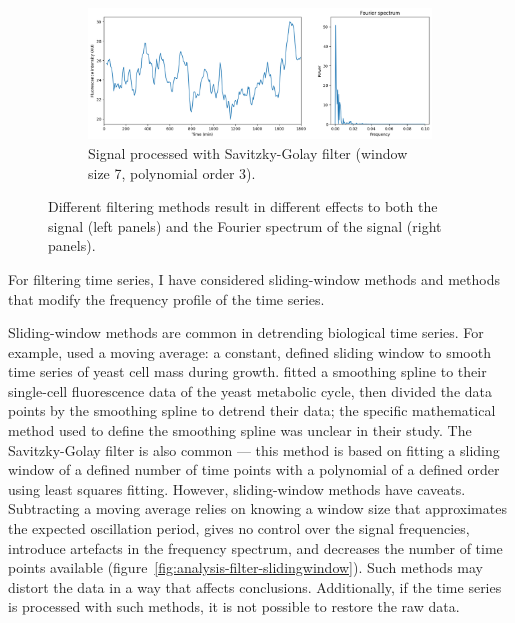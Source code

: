 \begin{figure}
  \begin{subfigure}[htpb]{0.8\textwidth}
   \centering
   \includegraphics[width=\textwidth]{fft_savgol}
   \caption{
     Signal processed with Savitzky-Golay filter (window size 7, polynomial order 3).
   }
   \label{fig:analysis-filter-savgol}
  \end{subfigure}
  \caption{
    Different filtering methods result in different effects to both the signal (left panels) and the Fourier spectrum of the signal (right panels).
  }
  \label{fig:analysis-filter}
\end{figure}

For filtering time series, I have considered sliding-window methods and methods that modify the frequency profile of the time series.

Sliding-window methods are common in detrending biological time series.
For example, \textcite{cunyHighresolutionMassMeasurements2022} used a moving average: a constant, defined sliding window to smooth time series of yeast cell mass during growth.
\textcite{papagiannakisAutonomousMetabolicOscillations2017} fitted a smoothing spline to their single-cell fluorescence data of the yeast metabolic cycle, then divided the data points by the smoothing spline to detrend their data; the specific mathematical method used to define the smoothing spline was unclear in their study.
The Savitzky-Golay filter is also common --- this method is based on fitting a sliding window of a defined number of time points with a polynomial of a defined order using least squares fitting.
However, sliding-window methods have caveats.
Subtracting a moving average relies on knowing a window size that approximates the expected oscillation period, gives no control over the signal frequencies, introduce artefacts in the frequency spectrum, and decreases the number of time points available (figure~\ref{fig:analysis-filter-slidingwindow}).
Such methods may distort the data in a way that affects conclusions.
Additionally, if the time series is processed with such methods, it is not possible to restore the raw data.

